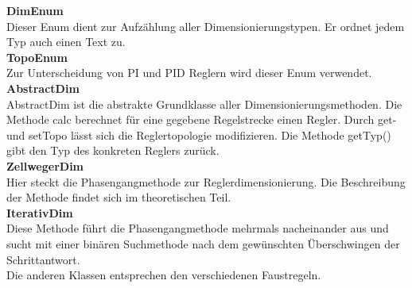 \textbf{DimEnum}\\
Dieser Enum dient zur Aufzählung aller Dimensionierungstypen. Er ordnet jedem Typ auch einen Text zu.\\

\textbf{TopoEnum}\\
Zur Unterscheidung von PI und PID Reglern wird dieser Enum verwendet.\\

\textbf{AbstractDim}\\
AbstractDim ist die abstrakte Grundklasse aller Dimensionierungsmethoden. Die Methode calc berechnet für eine gegebene Regelstrecke einen Regler. Durch get- und setTopo lässt sich die Reglertopologie modifizieren. Die Methode getTyp() gibt den Typ des konkreten Reglers zurück.\\

\textbf{ZellwegerDim}\\
Hier steckt die Phasengangmethode zur Reglerdimensionierung. Die Beschreibung der Methode findet sich im theoretischen Teil.\\

\textbf{IterativDim}\\
Diese Methode führt die Phasengangmethode mehrmals nacheinander aus und sucht mit einer binären Suchmethode nach dem gewünschten Überschwingen der Schrittantwort.\\

Die anderen Klassen entsprechen den verschiedenen Faustregeln.

